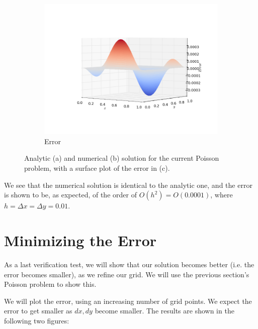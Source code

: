\documentclass[11pt]{report}
\begin{document}
\begin{figure}[h!]
\begin{subfigure}{0.6\textwidth}
  \includegraphics[width=1.0\linewidth]{images/example3_error}
  \caption{Error}
  \label{fig:sub3.3}
\end{subfigure}
\caption{Analytic (a) and numerical (b) solution for the current Poisson problem, with a surface plot of the  error in (c).}
\label{fig:example3}
\end{figure}

We see that the numerical solution is identical to the analytic one, and the error is shown to be, as expected, of the order of $O(h^2) = O(0.0001)$, where $h = \Delta x = \Delta y = 0.01$. 

\section{Minimizing the Error}
As a last verification test, we will show that our solution becomes better (i.e. the error becomes smaller), as we refine our grid. We will use the previous section's Poisson problem to show this.
\newline

We will plot the error, using an increasing number of grid points. We expect the error to get smaller as $dx, dy$ become smaller. The results are shown in the following two figures:
\end{document}
